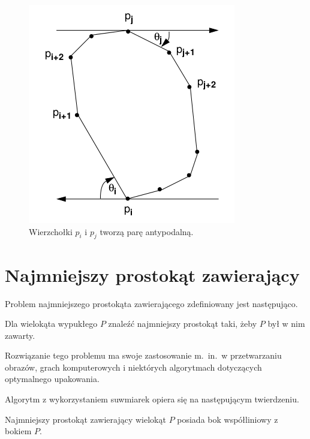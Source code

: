 \begin{figure}[htb]
  \centering
  \includegraphics[scale=0.5]{img/calipers1}
  \caption{\label{img:calipers1} Wierzchołki $p_i$ i $p_j$ tworzą parę
    antypodalną.}
\end{figure}

\section{Najmniejszy prostokąt zawierający}
Problem najmniejszego prostokąta zawierającego zdefiniowany jest
następująco.

\begin{problem}
  Dla wielokąta wypukłego $P$ znaleźć najmniejszy prostokąt taki, żeby
  $P$ był w nim zawarty.
\end{problem}

Rozwiązanie tego problemu ma swoje zastosowanie m.\ in.\ w
przetwarzaniu obrazów, grach komputerowych i niektórych algorytmach
dotyczących optymalnego upakowania.

Algorytm z wykorzystaniem suwmiarek opiera się na następującym
twierdzeniu.

\begin{twierdzenie}
  Najmniejszy prostokąt zawierający wielokąt $P$ posiada bok
  współliniowy z bokiem $P$.
\end{twierdzenie}

